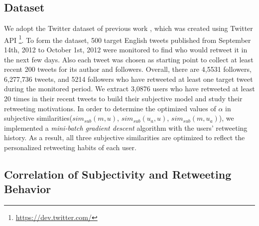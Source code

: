 \documentclass[letterpaper]{article}
\begin{document}
\subsection{Dataset}
We adopt the Twitter dataset of previous work \cite{Luo:2013RMF}, which was created using Twitter API \footnote{\url{https://dev.twitter.com/}}. 
To form the dataset, 500 target English tweets published from September 14th, 2012 to October 1st, 2012 were monitored to find who would retweet it in the next few days. 
Also each tweet was chosen as starting point to collect at least recent 200 tweets for its author and followers.
Overall, there are 4,5531 followers, 6,277,736 tweets, and 5214 followers who have retweeted at least one target tweet during the monitored period. 
We extract 3,0876 users who have retweeted at least 20 times in their recent tweets to build their subjective model and study their retweeting motivations. 
In order to determine the optimized values of $ \alpha $ in subjective similarities($ sim_{sub} \left( m,u \right) $, $ sim_{sub}\left( u_{a},u \right)  $, $ sim_{sub}\left( m,u_{a} \right)  $), we implemented a \textit{mini-batch gradient descent} algorithm with the users' retweeting history. As a result, all three subjective similarities are optimized to reflect the personalized retweeting habits of each user.

\subsection{Correlation of Subjectivity and Retweeting Behavior}
\end{document}
